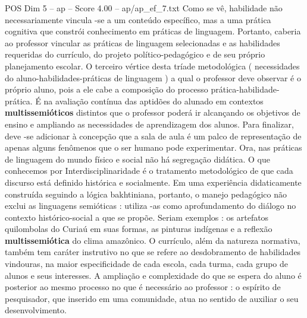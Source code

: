 \begin{textsample}{POS Dim 5 – ap – Score 4.00 – ap/ap\_ef\_7.txt}
Como se vê, habilidade não necessariamente vincula -se a um conteúdo específico, mas a uma prática cognitiva que constrói conhecimento em práticas de linguagem.
Portanto, caberia ao professor vincular as práticas de linguagem selecionadas e as habilidades requeridas do currículo, do projeto político-pedagógico e de seu próprio planejamento escolar.
O terceiro vértice desta tríade metodológica ( necessidades do aluno-habilidades-práticas de linguagem ) a qual o professor deve observar é o próprio aluno, pois a ele cabe a composição do processo prática-habilidade-prática.
É na avaliação contínua das aptidões do alunado em contextos \textbf{multissemióticos} distintos que o professor poderá ir alcançando os objetivos de ensino e ampliando as necessidades de aprendizagem dos alunos.
Para finalizar, deve -se adicionar à concepção que a sala de aula é um palco de representação de apenas alguns fenômenos que o ser humano pode experimentar.
Ora, nas práticas de linguagem do mundo físico e social não há segregação didática.
O que conhecemos por Interdisciplinaridade é o tratamento metodológico de que cada discurso está definido histórica e socialmente.
Em uma experiência didaticamente construída seguindo a lógica bakhtiniana, portanto, o manejo pedagógico não exclui as linguagens semióticas : utiliza -as como aprofundamento do diálogo no contexto histórico-social a que se propõe.
Seriam exemplos : os artefatos quilombolas do Curiaú em suas formas, as pinturas indígenas e a reflexão \textbf{multissemiótica} do clima amazônico.
O currículo, além da natureza normativa, também tem caráter instrutivo no que se refere ao desdobramento de habilidades vindouras, na maior especificidade de cada escola, cada turma, cada grupo de alunos e seus interesses.
A ampliação e complexidade do que se espera do aluno é posterior ao mesmo processo no que é necessário ao professor : o espírito de pesquisador, que inserido em uma comunidade, atua no sentido de auxiliar o seu desenvolvimento.

\end{textsample}
